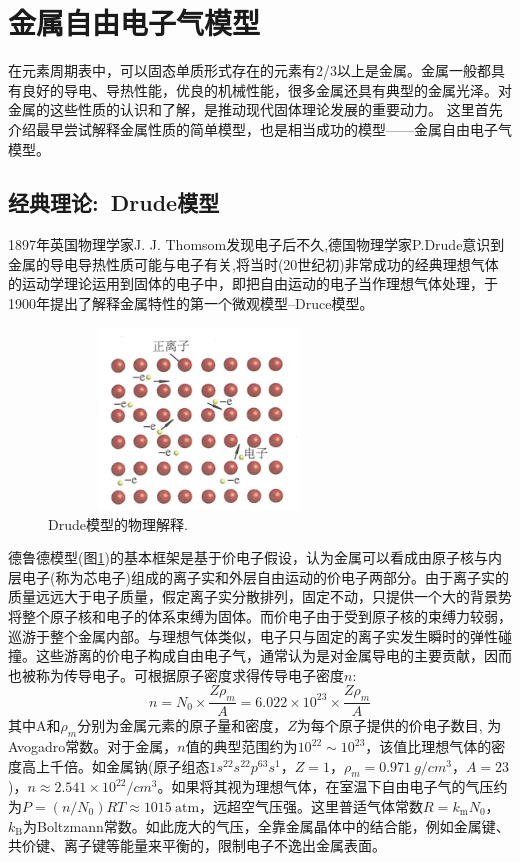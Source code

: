 \section{金属自由电子气模型}
在元素周期表中，可以固态单质形式存在的元素有2/3以上是金属。金属一般都具有良好的导电、导热性能，优良的机械性能，很多金属还具有典型的金属光泽。对金属的这些性质的认识和了解，是推动现代固体理论发展的重要动力。
这里首先介绍最早尝试解释金属性质的简单模型，也是相当成功的模型——金属自由电子气模型。 

\subsection{经典理论:~Drude模型}
1897年英国物理学家J. J. Thomsom发现电子后不久,德国物理学家P.Drude意识到金属的导电导热性质可能与电子有关,将当时(20世纪初)非常成功的经典理想气体的运动学理论运用到固体的电子中，即把自由运动的电子当作理想气体处理，于1900年提出了解释金属特性的第一个微观模型--Druce模型。
\begin{figure}[h!]
\centering
\vspace*{-0.05in}
\includegraphics[height=1.90in,width=3.15in,viewport=0 0 130 80,clip]{Figures/Drude_Model.png}
\caption{\small \textrm{Drude模型的物理解释.}}%
\label{Fig:Drude_model}
\end{figure} 
德鲁德模型(图\ref{Fig:Drude_model})的基本框架是基于价电子假设，认为金属可以看成由原子核与内层电子(称为芯电子)组成的离子实和外层自由运动的价电子两部分。由于离子实的质量远远大于电子质量，假定离子实分散排列，固定不动，只提供一个大的背景势将整个原子核和电子的体系束缚为固体。而价电子由于受到原子核的束缚力较弱，巡游于整个金属内部。与理想气体类似，电子只与固定的离子实发生瞬时的弹性碰撞。这些游离的价电子构成自由电子气，通常认为是对金属导电的主要贡献，因而也被称为传导电子。可根据原子密度求得传导电子密度$n$:
\begin{equation}
	n=N_0\times\dfrac{Z\rho_m}A=6.022\times10^{23}\times\dfrac{Z\rho_m}A
	\label{eq:valence_density}
\end{equation}
其中A和$\rho_m$分别为金属元素的原子量和密度，$Z$为每个原子提供的价电子数目, 为Avogadro常数。对于金属，$n$值的典型范围约为$10^{22}\sim10^{23}$，该值比理想气体的密度高上千倍。如金属钠(原子组态$1s^22s^22p^63s^1$，$Z=1$，$\rho_m=0.971~g/cm^3$，$A=23$)，$n\approx2.541\times10^{22}/cm^3$。如果将其视为理想气体，在室温下自由电子气的气压约为$P=(n/N_0)RT\approx1015~\mathrm{atm}$，远超空气压强。这里普适气体常数$R=k_{\mathrm{m}}N_0$，$k_{\mathrm{B}}$为Boltzmann常数。如此庞大的气压，全靠金属晶体中的结合能，例如金属键、共价键、离子键等能量来平衡的，限制电子不逸出金属表面。

